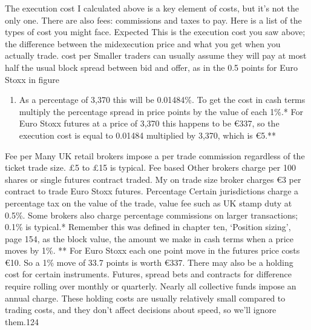 \endgroup



The execution cost I calculated above is a key element of costs, but it's not the only one. There are also fees: commissions and taxes to pay. Here is a list of the types of cost you might face. Expected This is the execution cost you saw above; the difference between the midexecution price and what you get when you actually trade. cost per Smaller traders can usually assume they will pay at most half the usual block spread between bid and offer, as in the 0.5 points for Euro Stoxx in figure \begin{enumerate}
\item As a percentage of 3,370 this will be 0.01484\%. To get the cost in cash terms multiply the percentage spread in price points by the value of each 1\%.* For Euro Stoxx futures at a price of 3,370 this happens to be €337, so the execution cost is equal to 0.01484 multiplied by 3,370, which is €5.**\end{enumerate}
Fee per Many UK retail brokers impose a per trade commission regardless of the ticket trade size. £5 to £15 is typical. Fee based Other brokers charge per 100 shares or single futures contract traded. My on trade size broker charges €3 per contract to trade Euro Stoxx futures. Percentage Certain jurisdictions charge a percentage tax on the value of the trade, value fee such as UK stamp duty at 0.5\%. Some brokers also charge percentage commissions on larger transactions; 0.1\% is typical.* Remember this was defined in chapter ten, ‘Position sizing', page 154, as the block value, the amount we make in cash terms when a price moves by 1\%. ** For Euro Stoxx each one point move in the futures price costs €10. So a 1\% move of 33.7 points is worth €337. There may also be a holding cost for certain instruments. Futures, spread bets and contracts for difference require rolling over monthly or quarterly. Nearly all collective funds impose an annual charge. These holding costs are usually relatively small compared to trading costs, and they don't affect decisions about speed, so we'll ignore them.124


